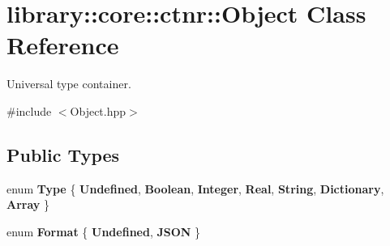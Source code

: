 \hypertarget{classlibrary_1_1core_1_1ctnr_1_1_object}{}\section{library\+:\+:core\+:\+:ctnr\+:\+:Object Class Reference}
\label{classlibrary_1_1core_1_1ctnr_1_1_object}


Universal type container.  




{\ttfamily \#include $<$Object.\+hpp$>$}

\subsection*{Public Types}
\begin{DoxyCompactItemize}
\item 
\mbox{\label{classlibrary_1_1core_1_1ctnr_1_1_object_a0766006ad111133d70349019551b31d6}} 
enum {\bfseries Type} \{ \newline
{\bfseries Undefined}, 
{\bfseries Boolean}, 
{\bfseries Integer}, 
{\bfseries Real}, 
\newline
{\bfseries String}, 
{\bfseries Dictionary}, 
{\bfseries Array}
 \}
\item 
\mbox{\label{classlibrary_1_1core_1_1ctnr_1_1_object_a7bf8961c4ef65f691aa2993ec405c647}} 
enum {\bfseries Format} \{ {\bfseries Undefined}, 
{\bfseries J\+S\+ON}
 \}
\end{DoxyCompactItemize}
